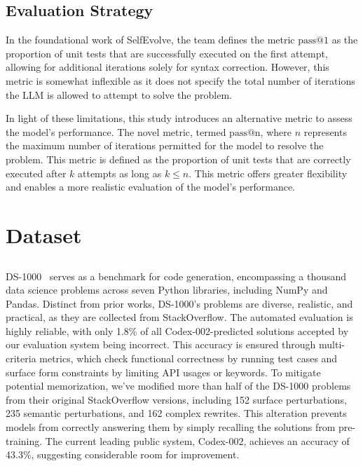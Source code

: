 \documentclass[a4paper,oneside]{book}
\begin{document}
\subsection{Evaluation Strategy}
In the foundational work of SelfEvolve, the team defines the metric $\text{pass@1}$ as the proportion of unit tests that are successfully executed on the first attempt, allowing for additional iterations solely for syntax correction. However, this metric is somewhat inflexible as it does not specify the total number of iterations the LLM is allowed to attempt to solve the problem.

In light of these limitations, this study introduces an alternative metric to assess the model's performance. The novel metric, termed $\text{pass@n}$, where $n$ represents the maximum number of iterations permitted for the model to resolve the problem. This metric is defined as the proportion of unit tests that are correctly executed after $k$ attempts as long as $k \leq n$. This metric offers greater flexibility and enables a more realistic evaluation of the model's performance.

\section{Dataset}
\subsection{}
DS-1000~\cite{lai2023ds} serves as a benchmark for code generation, encompassing a thousand data science problems across seven Python libraries, including NumPy and Pandas. Distinct from prior works, DS-1000's problems are diverse, realistic, and practical, as they are collected from StackOverflow. The automated evaluation is highly reliable, with only 1.8\% of all Codex-002-predicted solutions accepted by our evaluation system being incorrect. This accuracy is ensured through multi-criteria metrics, which check functional correctness by running test cases and surface form constraints by limiting API usages or keywords. To mitigate potential memorization, we've modified more than half of the DS-1000 problems from their original StackOverflow versions, including 152 surface perturbations, 235 semantic perturbations, and 162 complex rewrites. This alteration prevents models from correctly answering them by simply recalling the solutions from pre-training. The current leading public system, Codex-002, achieves an accuracy of 43.3\%, suggesting considerable room for improvement.
\end{document}
